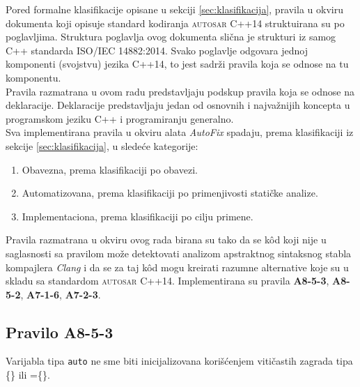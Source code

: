 \documentclass[12pt,oneside]{memoir}
\begin{document}
Pored formalne klasifikacije opisane u sekciji \ref{sec:klasifikacija}, pravila u okviru dokumenta koji opisuje standard kodiranja \textsc{autosar} C++14 \cite{AutosarGuidelines} struktuirana su po poglavljima.
Struktura poglavlja ovog dokumenta slična je strukturi iz samog C++ standarda ISO/IEC 14882:2014. Svako poglavlje odgovara jednoj komponenti (svojstvu) jezika C++14, to jest sadrži pravila koja se odnose na tu komponentu.
\\
\indent
Pravila razmatrana u ovom radu predstavljaju podskup pravila koja se odnose na deklaracije. Deklaracije predstavljaju jedan
od osnovnih i najvažnijih koncepta u programskom jeziku C++ i programiranju generalno.
\\
\indent
Sva implementirana pravila u okviru alata \textit{AutoFix} spadaju, prema klasifikaciji iz sekcije \ref{sec:klasifikacija}, u sledeće kategorije:
\begin{enumerate}
  \item{Obavezna, prema klasifikaciji po obavezi.}
  \item{Automatizovana, prema klasifikaciji po primenjivosti statičke analize.}
  \item{Implementaciona, prema klasifikaciji po cilju primene.}
\end{enumerate}
Pravila razmatrana u okviru ovog rada birana su tako da se k\^{o}d koji nije u saglasnosti sa pravilom mo\v{z}e detektovati analizom apstraktnog sintaksnog stabla kompajlera \textit{Clang} i da se za taj k\^{o}d mogu kreirati razumne alternative koje su u skladu sa standardom \textsc{autosar} C++14.
Implementirana su pravila \textbf{A8-5-3}, \textbf{A8-5-2}, \textbf{A7-1-6}, \textbf{A7-2-3}.

\subsection{Pravilo A8-5-3}
\begin{center}
\begin{tcolorbox}
Varijabla tipa \texttt{auto} ne sme biti inicijalizovana kori\v{s}\'{c}enjem viti\v{c}astih zagrada tipa \{\} ili =\{\}.
\end{tcolorbox}
\end{center}
\end{document}
